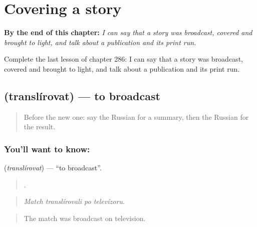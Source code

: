 
\chapter{Covering a story}
\label{ch:ru-covering-a-story}

\begin{chapteropening}
\textbf{By the end of this chapter:} \emph{I can say that a story was broadcast, covered and brought to light, and talk about a publication and its print run.}

Complete the last lesson of chapter 286: I can say that a story was broadcast, covered and brought to light, and talk about a publication and its print run.
\end{chapteropening}

\section[\texorpdfstring{\ru{транслировать} (translírovat)}{транслировать (translírovat)}]{ (translírovat) — to broadcast}

\label{lesson:RU-C286-translirovat}



\begin{quote}
Before the new one: say the Russian for a summary, then the Russian for the result.
\end{quote}

\subsection*{You'll want to know: }
\textbf{} (\emph{translírovat}) — \textquotedblleft{}to broadcast\textquotedblright{}.

\begin{quote}
   .
\end{quote}

\begin{quote}
\emph{Match translírovali po televízoru.}
\end{quote}

\begin{quote}
The match was broadcast on television.
\end{quote}

